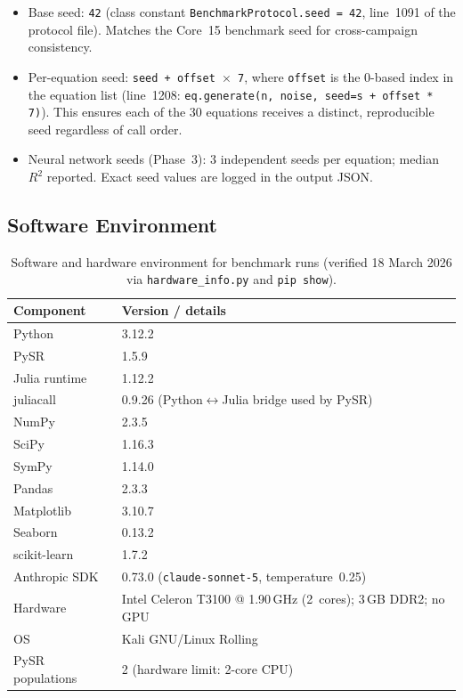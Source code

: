 \documentclass[twoside,11pt]{article}
\begin{document}
\begin{itemize}
  \item Base seed: \texttt{42} (class constant
    \texttt{BenchmarkProtocol.seed = 42}, line~1091 of the protocol file).
    Matches the Core~15 benchmark seed for cross-campaign consistency.
  \item Per-equation seed: \texttt{seed + offset $\times$ 7}, where
    \texttt{offset} is the 0-based index in the equation list
    (line~1208: \texttt{eq.generate(n, noise, seed=s + offset * 7)}).
    This ensures each of the 30 equations receives a distinct, reproducible
    seed regardless of call order.
  \item Neural network seeds (Phase~3): 3 independent seeds per equation;
    median $R^2$ reported. Exact seed values are logged in the output JSON.
\end{itemize}

\subsection*{Software Environment}

\begin{table}[H]
\centering
\caption{Software and hardware environment for benchmark runs
         (verified 18 March 2026 via \texttt{hardware\_info.py} and
         \texttt{pip show}).}
\label{tab:software_env}
\small
\begin{tabular}{ll}
\toprule
\textbf{Component} & \textbf{Version / details} \\
\midrule
Python           & 3.12.2 \\
PySR             & 1.5.9 \\
Julia runtime    & 1.12.2 \\
juliacall        & 0.9.26 (Python$\leftrightarrow$Julia bridge used by PySR) \\
NumPy            & 2.3.5 \\
SciPy            & 1.16.3 \\
SymPy            & 1.14.0 \\
Pandas           & 2.3.3 \\
Matplotlib       & 3.10.7 \\
Seaborn          & 0.13.2 \\
scikit-learn     & 1.7.2 \\
Anthropic SDK    & 0.73.0 (\texttt{claude-sonnet-5},
                   temperature~0.25) \\
\midrule
Hardware         & Intel Celeron T3100 @ 1.90\,GHz (2~cores);
                   3\,GB DDR2; no GPU \\
OS               & Kali GNU/Linux Rolling \\
PySR populations & 2 (hardware limit: 2-core CPU) \\
\bottomrule
\end{tabular}
\end{table}
\end{document}
